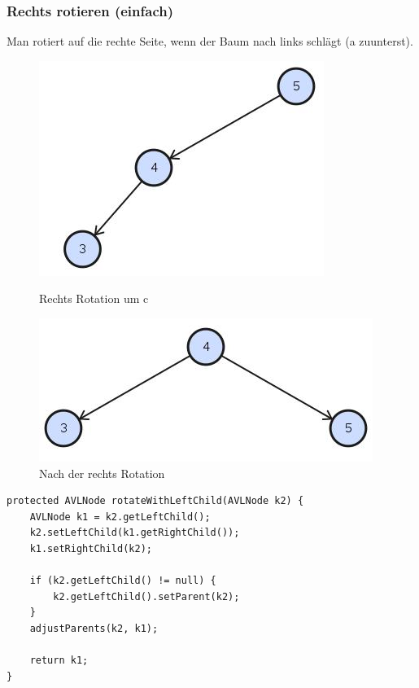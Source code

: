 \subsubsection{Rechts rotieren (einfach)}
Man rotiert auf die rechte Seite, wenn der Baum nach links schlägt (a zuunterst).
\begin{figure}[h!]
	\centering
	\begin{minipage}[t]{0.4\textwidth}
		\centering
		\includegraphics[width=0.7\linewidth]{images/avl_right_rotation_1}
		\caption{Rechts Rotation um c}
		\label{fig:trieexample}
	\end{minipage}
	\begin{minipage}[t]{0.4\textwidth}
		\centering
		\includegraphics[width=0.9\linewidth]{images/avl_rotation_final}
		\caption{Nach der rechts Rotation}
		\label{fig:searchtreeinsert2}
	\end{minipage}
\end{figure}


\begin{lstlisting}[caption=AVL Tree: Single right rotation]
protected AVLNode rotateWithLeftChild(AVLNode k2) {
	AVLNode k1 = k2.getLeftChild();
	k2.setLeftChild(k1.getRightChild());
	k1.setRightChild(k2);

	if (k2.getLeftChild() != null) {
		k2.getLeftChild().setParent(k2);
	}
	adjustParents(k2, k1);

	return k1;
}
\end{lstlisting}

